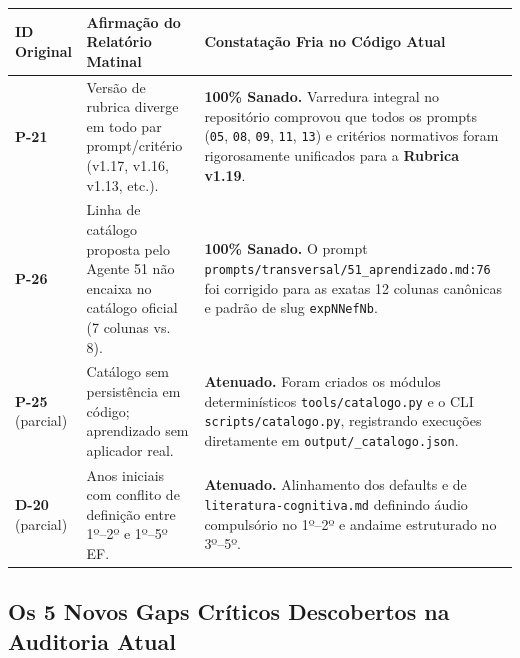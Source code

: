 \documentclass[11pt,a4paper]{article}
\begin{document}
\begin{longtable}{@{}p{1.8cm} p{6.5cm} p{7.5cm}@{}}
\toprule
\textbf{ID Original} & \textbf{Afirmação do Relatório Matinal} & \textbf{Constatação Fria no Código Atual} \\
\midrule
\endhead
\bottomrule
\endfoot
\textbf{P-21} & Versão de rubrica diverge em todo par prompt/critério (v1.17, v1.16, v1.13, etc.). & \textbf{100\% Sanado.} Varredura integral no repositório comprovou que todos os prompts (\texttt{05}, \texttt{08}, \texttt{09}, \texttt{11}, \texttt{13}) e critérios normativos foram rigorosamente unificados para a \textbf{Rubrica v1.19}. \\
\midrule
\textbf{P-26} & Linha de catálogo proposta pelo Agente 51 não encaixa no catálogo oficial (7 colunas vs. 8). & \textbf{100\% Sanado.} O prompt \texttt{prompts/transversal/51\_aprendizado.md:76} foi corrigido para as exatas 12 colunas canônicas e padrão de slug \texttt{expNNefNb}. \\
\midrule
\textbf{P-25} (parcial) & Catálogo sem persistência em código; aprendizado sem aplicador real. & \textbf{Atenuado.} Foram criados os módulos determinísticos \texttt{tools/catalogo.py} e o CLI \texttt{scripts/catalogo.py}, registrando execuções diretamente em \texttt{output/\_catalogo.json}. \\
\midrule
\textbf{D-20} (parcial) & Anos iniciais com conflito de definição entre 1º--2º e 1º--5º EF. & \textbf{Atenuado.} Alinhamento dos defaults e de \texttt{literatura-cognitiva.md} definindo áudio compulsório no 1º--2º e andaime estruturado no 3º--5º. \\
\end{longtable}

\subsection{Os 5 Novos Gaps Críticos Descobertos na Auditoria Atual}
\end{document}
